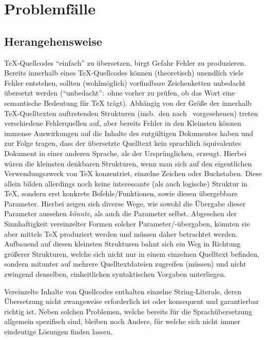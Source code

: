 \section{Problemfälle}
\subsection{Herangehensweise}
\TeX{}-Quellcodes \enquote{einfach} zu übersetzen, birgt Gefahr Fehler zu produzieren. Bereits innerhalb eines \TeX{}-Quellcodes können (theoretisch) unendlich viele Fehler entstehen, sollten (wohlmöglich) vorfindbare Zeichenketten unbedacht übersetzt werden (\enquote{unbedacht}:\ ohne vorher zu prüfen, ob das Wort eine semantische Bedeutung für \TeX{} trägt). Abhängig von der Größe der innerhalb \TeX{}-Quelltexten auftretenden Strukturen (insb.\ den nach~\cite{texbook} vorgesehenen) treten verschiedene Fehlerquellen auf, aber bereits Fehler in den Kleinsten können immense Auswirkungen auf die Inhalte des entgültigen Dokumentes haben und zur Folge tragen, dass der übersetzte Quelltext kein sprachlich äquivalentes Dokument in einer anderen Sprache, als der Ursprünglichen, erzeugt. 
Hierbei wären die kleinsten denkbaren Strukturen, wenn man sich auf den eigentlichen Verwendungszweck von \TeX{} konzentriet, einzelne Zeichen oder Buchstaben. Diese allein bilden allerdings noch keine interessante (als auch logische) Struktur in \TeX{}, sondern erst konkrete Befehle/Funktionen, sowie diesen übergebbare Parameter. Hierbei zeigen sich diverse Wege, wie sowohl die Übergabe dieser Parameter aussehen \textit{könnte},%
als auch die Parameter selbst.%
Abgesehen der Sinnhaftigkeit vereinzelter Formen solcher Parameter/-übergaben, könnten sie aber mittels \TeX{} produziert werden und müssen daher betrachtet werden.
Aufbauend auf diesen kleinsten Strukturen bahnt sich ein Weg in Richtung größerer Strukturen, welche sich nicht nur in einem einzelnen Quelltext befinden, sondern mitunter auf mehrere Quelltextdateien zugreifen (müssen) und nicht zwingend denselben, einheitlichen syntaktischen Vorgaben unterliegen.%

Vereinzelte Inhalte von Quellcodes enthalten einzelne String-Literale, deren Übersetzung nicht zwangsweise erforderlich ist oder konsequent und garantierbar richtig ist. 
Neben solchen Problemen, welche bereits für die Sprachübersetzung allgemein spezifisch sind, bleiben noch Andere, für welche sich nicht immer eindeutige Lösungen finden lassen.

